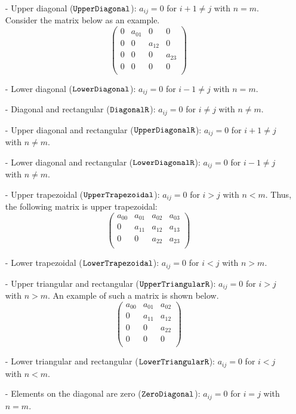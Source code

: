 \begin{itemize}
\item[-] Upper diagonal ($\text{\ttfamily UpperDiagonal}$): $a_{ij} = 0$ for $i + 1 \neq j$ with $n = m$. Consider the matrix below as an example.
%
$$
\left(
\begin{array}{cccc}
0 & a_{01} & 0 & 0 \\ 
0 & 0 & a_{12} & 0 \\ 
0 & 0 & 0 & a_{23} \\ 
0 & 0 & 0 & 0 \\ 
\end{array}
\right)
$$
%
\item[-] Lower diagonal ($\text{\ttfamily LowerDiagonal}$): $a_{ij} = 0$ for $i - 1 \neq j$ with $n = m$.
%
\item[-] Diagonal and rectangular ($\text{\ttfamily DiagonalR}$): $a_{ij} = 0$ for $i \neq j$ with $n \neq m$.
%
\item[-] Upper diagonal and rectangular ($\text{\ttfamily UpperDiagonalR}$): $a_{ij} = 0$ for $i + 1 \neq j$ with $n \neq m$.
%
\item[-] Lower diagonal and rectangular ($\text{\ttfamily LowerDiagonalR}$): $a_{ij} = 0$ for $i - 1 \neq j$ with $n \neq m$.
%
\item[-] Upper trapezoidal ($\text{\ttfamily UpperTrapezoidal}$): $a_{ij} = 0$ for $i > j$ with $n < m$. Thus, the following matrix is upper trapezoidal:
%
$$
\left(
\begin{array}{cccc}
a_{00} & a_{01} & a_{02} & a_{03} \\ 
0 & a_{11} & a_{12} & a_{13} \\ 
0 & 0 & a_{22} & a_{23} \\ 
\end{array}
\right)
$$
%
\item[-] Lower trapezoidal ($\text{\ttfamily LowerTrapezoidal}$): $a_{ij} = 0$ for $i < j$ with $n > m$.
%
\item[-] Upper triangular and rectangular ($\text{\ttfamily UpperTriangularR}$): $a_{ij} = 0$ for $i > j$ with $n > m$. An example of such a matrix is shown below.
%
$$
\left(
\begin{array}{ccc}
a_{00} & a_{01} & a_{02} \\ 
0 & a_{11} & a_{12} \\ 
0 & 0 & a_{22} \\ 
0 & 0 & 0 \\ 
\end{array}
\right)
$$
%
\item[-] Lower triangular and rectangular ($\text{\ttfamily LowerTriangularR}$): $a_{ij} = 0$ for $i < j$ with $n < m$.
%
\item[-] Elements on the diagonal are zero ($\text{\ttfamily ZeroDiagonal}$): $a_{ij} = 0$ for $i = j$ with $n = m$.
\end{itemize}

